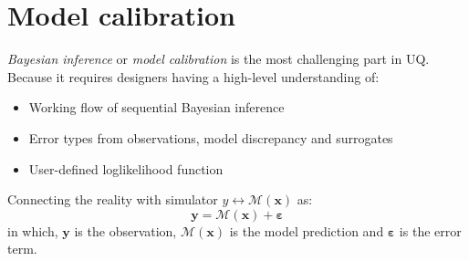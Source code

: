\documentclass{ol-softwaremanual}
\begin{document}
\section{Model calibration}
\textit{Bayesian inference} or \textit{model calibration} is the most challenging part in UQ. Because it requires designers having a high-level understanding of:
\begin{itemize}
    \item Working flow of sequential Bayesian inference 
    \item Error types from observations, model discrepancy and surrogates
    \item User-defined loglikelihood function
\end{itemize}

Connecting the reality with simulator $y \leftrightarrow \mathcal{M}(\boldsymbol{x})$ as: 
\begin{equation*}
\boldsymbol{y} = \mathcal{M}(\boldsymbol{x})
+ \boldsymbol{\varepsilon}
\end{equation*}
in which, $\boldsymbol{y}$ is the observation, $\mathcal{M}(\boldsymbol{x})$ is the model prediction and $\boldsymbol{\varepsilon}$ is the error term.
\end{document}
